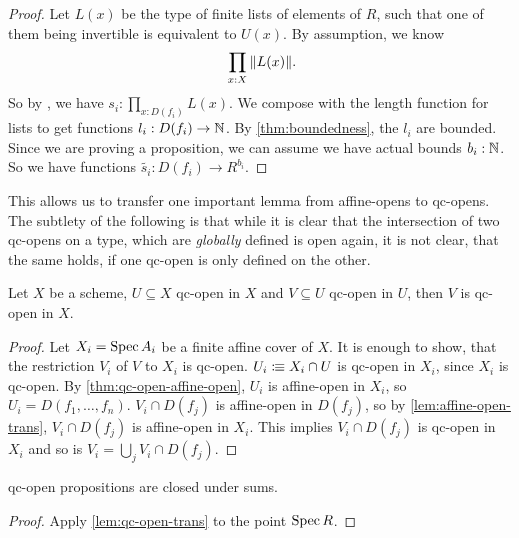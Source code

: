 \begin{proof}
  Let $L(x)$ be the type of finite lists of elements of $R$,
  such that one of them being invertible is equivalent to $U(x)$.
  By assumption, we know
  \[\prod_{x:X}\|L(x)\|\rlap{.}\]
  So by , we have $s_i:\prod_{x:D(f_i)}L(x)$.
  We compose with the length function for lists to get functions $l_i:D(f_i)\to\mathbb{N}$.
  By \cref{thm:boundedness}, the $l_i$ are bounded.
  Since we are proving a proposition, we can assume we have actual bounds $b_i:\mathbb{N}$.
  So we have functions $\tilde{s_i}:D(f_i)\to R^{b_i}$.
\end{proof}

This allows us to transfer one important lemma from affine-opens to qc-opens.
The subtlety of the following is that while it is clear that the intersection of two
qc-opens on a type, which are \emph{globally} defined is open again, it is not clear,
that the same holds, if one qc-open is only defined on the other.

\begin{lemma}%
  \label{lem:qc-open-trans}
  Let $X$ be a scheme, $U\subseteq X$ qc-open in $X$ and $V\subseteq U$ qc-open in $U$,
  then $V$ is qc-open in $X$.
\end{lemma}

\begin{proof}
  Let $X_i=\operatorname{Spec} A_i$ be a finite affine cover of $X$.
  It is enough to show, that the restriction $V_i$ of $V$ to $X_i$ is qc-open.
  $U_i\vcentcolon\mspace{-1.2mu}\equiv X_i\cap U$ is qc-open in $X_i$, since $X_i$ is qc-open.
  By \cref{thm:qc-open-affine-open}, $U_i$ is affine-open in $X_i$,
  so $U_i=D(f_1,\dots,f_n)$.
  $V_i\cap D(f_j)$ is affine-open in $D(f_j)$, so by \cref{lem:affine-open-trans},
  $V_i\cap D(f_j)$ is affine-open in $X_i$.
  This implies $V_i\cap D(f_j)$ is qc-open in $X_i$ and so is $V_i=\bigcup_{j}V_i\cap D(f_j)$.
\end{proof}

\begin{lemma}%
  \label{lem:qc-open-sigma-closed}
  qc-open propositions are closed under sums.
\end{lemma}

\begin{proof}
  Apply \cref{lem:qc-open-trans} to the point $\operatorname{Spec} R$.
\end{proof}